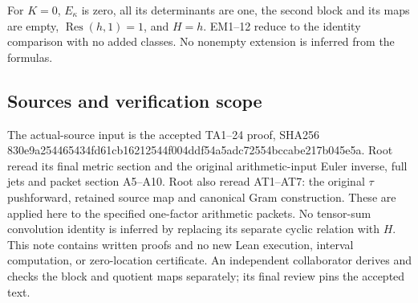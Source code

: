 For \(K=0\), \(E_\kappa\) is zero, all its determinants are one, the second
block and its maps are empty, \(\operatorname{Res}(h,1)=1\), and \(H=h\). EM1--12 reduce to
the identity comparison with no added classes. No nonempty extension
is inferred from the formulas.

\subsection{Sources and verification scope}\label{sources-and-verification-scope}

The actual-source input is the accepted TA1--24 proof, SHA256
830e9a254465434fd61cb16212544f004ddf54a5adc72554bccabe217b045e5a.
Root reread its final metric section and the original arithmetic-input
Euler inverse, full jets and packet section A5--A10. Root also reread
AT1--AT7: the original \(\tau\) pushforward, retained source map and canonical
Gram construction. These are applied here to the specified one-factor
arithmetic packets. No tensor-sum convolution identity is inferred by
replacing its separate cyclic relation with \(H\). This note contains written
proofs and no new Lean execution, interval computation, or zero-location
certificate. An independent collaborator derives and checks the block
and quotient maps separately; its final review pins the accepted text.
